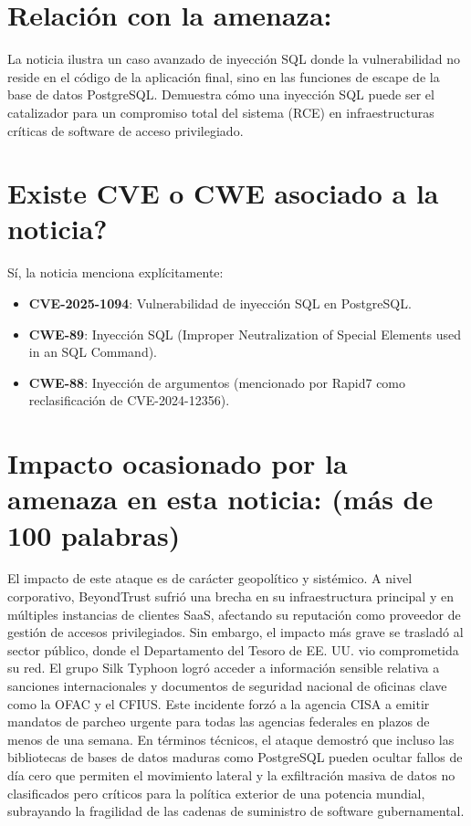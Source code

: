     \section{Relación con la amenaza:}
    La noticia ilustra un caso avanzado de inyección SQL donde la vulnerabilidad no reside en el código de la aplicación final, sino en las funciones de escape de la base de datos PostgreSQL. Demuestra cómo una inyección SQL puede ser el catalizador para un compromiso total del sistema (RCE) en infraestructuras críticas de software de acceso privilegiado.

    \section{\textquestiondown Existe CVE o CWE asociado a la noticia?}
    Sí, la noticia menciona explícitamente:
    \begin{itemize}
        \item \textbf{CVE-2025-1094}: Vulnerabilidad de inyección SQL en PostgreSQL.
        \item \textbf{CWE-89}: Inyección SQL (Improper Neutralization of Special Elements used in an SQL Command).
        \item \textbf{CWE-88}: Inyección de argumentos (mencionado por Rapid7 como reclasificación de CVE-2024-12356).
    \end{itemize}

    \section{Impacto ocasionado por la amenaza en esta noticia: (más de 100 palabras)}
    El impacto de este ataque es de carácter geopolítico y sistémico. A nivel corporativo, BeyondTrust sufrió una brecha en su infraestructura principal y en múltiples instancias de clientes SaaS, afectando su reputación como proveedor de gestión de accesos privilegiados. Sin embargo, el impacto más grave se trasladó al sector público, donde el Departamento del Tesoro de EE. UU. vio comprometida su red. El grupo Silk Typhoon logró acceder a información sensible relativa a sanciones internacionales y documentos de seguridad nacional de oficinas clave como la OFAC y el CFIUS. Este incidente forzó a la agencia CISA a emitir mandatos de parcheo urgente para todas las agencias federales en plazos de menos de una semana. En términos técnicos, el ataque demostró que incluso las bibliotecas de bases de datos maduras como PostgreSQL pueden ocultar fallos de día cero que permiten el movimiento lateral y la exfiltración masiva de datos no clasificados pero críticos para la política exterior de una potencia mundial, subrayando la fragilidad de las cadenas de suministro de software gubernamental.